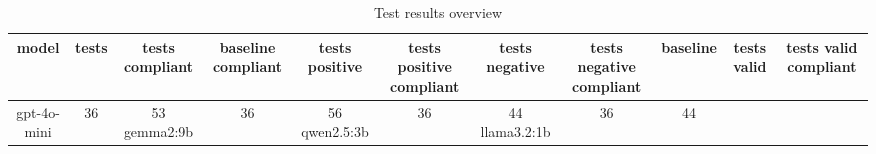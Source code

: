 
  \begin{table}[h!]
  \centering
  \begin{tabular}{|c|c|c|c|c|c|c|c|c|c|c|}
  \hline
  model & tests & tests compliant & baseline compliant & tests positive & tests positive compliant & tests negative & tests negative compliant & baseline & tests valid & tests valid compliant \\
  \hline
  gpt-4o-mini & 36 & 53%
\hline
gemma2:9b & 36 & 56%
\hline
qwen2.5:3b & 36 & 44%
\hline
llama3.2:1b & 36 & 44%
  \end{tabular}
  \caption{Test results overview}
  
  \end{table}
  